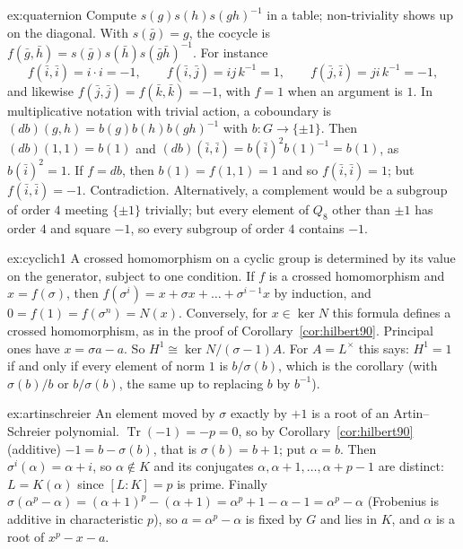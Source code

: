 \begin{solution}{ex:quaternion}
\idea Compute $s(g)s(h)s(gh)^{-1}$ in a table; non-triviality shows up on the diagonal.
\writeup With $s(\bar g)=g$, the cocycle is $f(\bar g,\bar h)=s(\bar g)s(\bar h)s(\bar g\bar h)^{-1}$. For instance
\[
f(\bar i,\bar i)=i\cdot i=-1,\qquad f(\bar i,\bar j)=ij\,k^{-1}=1,\qquad f(\bar j,\bar i)=ji\,k^{-1}=-1,
\]
and likewise $f(\bar j,\bar j)=f(\bar k,\bar k)=-1$, with $f=1$ when an argument is $1$. In multiplicative notation with trivial action, a coboundary is $(db)(g,h)=b(g)b(h)b(gh)^{-1}$ with $b\colon G\to\{\pm1\}$. Then $(db)(1,1)=b(1)$ and $(db)(\bar i,\bar i)=b(\bar i)^2b(1)^{-1}=b(1)$, as $b(\bar i)^2=1$. If $f=db$,
then $b(1)=f(1,1)=1$ and so $f(\bar i,\bar i)=1$; but $f(\bar i,\bar i)=-1$. Contradiction. Alternatively, a complement would be a subgroup of order $4$ meeting $\{\pm1\}$ trivially; but every element of $Q_8$
other than $\pm1$ has order $4$ and square $-1$, so every subgroup of order $4$ contains $-1$.
\end{solution}

\begin{solution}{ex:cyclich1}
\idea A crossed homomorphism on a cyclic group is determined by its value on the generator, subject to one condition.
\writeup If $f$ is a crossed homomorphism and $x=f(\sigma)$, then $f(\sigma^i)=x+\sigma x+\dots+\sigma^{i-1}x$ by induction, and $0=f(1)=f(\sigma^n)=N(x)$. Conversely, for $x\in\ker N$ this formula defines a crossed homomorphism, as in the proof of
Corollary~\ref{cor:hilbert90}. Principal ones have $x=\sigma a-a$. So $H^1\cong\ker N/(\sigma-1)A$. For $A=L^\times$ this says: $H^1=1$ if and only if every element of norm $1$ is $b/\sigma(b)$, which is the corollary (with
$\sigma(b)/b$ or $b/\sigma(b)$, the same up to replacing $b$ by $b^{-1}$).
\end{solution}

\begin{solution}{ex:artinschreier}
\idea An element moved by $\sigma$ exactly by $+1$ is a root of an Artin--Schreier polynomial.
\writeup $\operatorname{Tr}(-1)=-p=0$, so by Corollary~\ref{cor:hilbert90} (additive) $-1=b-\sigma(b)$, that is $\sigma(b)=b+1$; put $\alpha=b$. Then $\sigma^i(\alpha)=\alpha+i$, so $\alpha\notin K$ and its conjugates
$\alpha,\alpha+1,\dots,\alpha+p-1$ are distinct: $L=K(\alpha)$ since $[L:K]=p$ is prime. Finally $\sigma(\alpha^p-\alpha)=(\alpha+1)^p-(\alpha+1)=\alpha^p+1-\alpha-1=\alpha^p-\alpha$ (Frobenius is additive in characteristic $p$), so
$a=\alpha^p-\alpha$ is fixed by $G$ and lies in $K$, and $\alpha$ is a root of $x^p-x-a$.
\end{solution}


